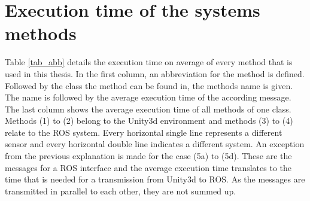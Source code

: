 \chapter{Execution time of the systems methods}\label{Attachtable}
 Table \ref{tab_abb} details the execution time on average of every method that is used in this thesis. In the first column, an abbreviation for the method is defined. Followed by the class the method can be found in, the methods name is given. The name is followed by the average execution time of the according message. The last column shows the average execution time of all methods of one class. Methods (1) to (2) belong to the Unity3d environment and methods (3) to (4) relate to the \ac{ROS} system. Every horizontal single line represents a different sensor and every horizontal double line indicates a different system. An exception from the previous explanation is made for the case (5a) to (5d). These are the messages for a \ac{ROS} interface and the average execution time translates to the time that is needed for a transmission from Unity3d to \ac{ROS}. As the messages are transmitted in parallel to each other, they are not summed up. 
 \newpage
